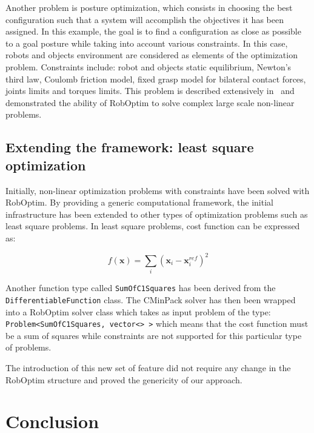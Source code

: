 \documentclass[conference,final,a4paper,twocolumn,9pt]{IEEEtran}
\begin{document}
Another problem is posture optimization, which consists in choosing
the best configuration such that a system will accomplish the
objectives it has been assigned. In this example, the goal is to find
a configuration as close as possible to a goal posture while taking
into account various constraints. In this case, robots and objects
environment are considered as elements of the optimization
problem. Constraints include: robot and objects static equilibrium,
Newton's third law, Coulomb friction model, fixed grasp model for
bilateral contact forces, joints limits and torques limits. This
problem is described extensively
in~\cite{DBLP:conf/icra/BouyarmaneK11} and demonstrated the ability of
RobOptim to solve complex large scale non-linear problems.


\subsection{Extending the framework: least square optimization}


Initially, non-linear optimization problems with constraints have been
solved with RobOptim. By providing a generic computational framework,
the initial infrastructure has been extended to other types of
optimization problems such as least square problems. In least square
problems, cost function can be expressed as:

\begin{equation}
  f(\mathbf{x}) = \sum_i (\mathbf{x}_i - \mathbf{x}^{ref}_i)^2
\end{equation}


Another function type called \texttt{SumOfC1Squares} has been derived
from the \texttt{DifferentiableFunction} class. The CMinPack solver
has then been wrapped into a RobOptim solver class which takes as
input problem of the type: \texttt{Problem<SumOfC1Squares, vector<> >}
which means that the cost function must be a sum of squares while
constraints are not supported for this particular type of problems.

The introduction of this new set of feature did not require any change
in the RobOptim structure and proved the genericity of our approach.


\section{Conclusion}\label{sec:conclusion}
\end{document}
